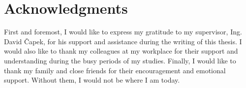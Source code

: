 
\section*{Acknowledgments}

First and foremost, I would like to express my gratitude to my supervisor, Ing. David Čapek, for his support and assistance during the writing of this thesis. I would also like to thank my colleagues at my workplace for their support and understanding during the busy periods of my studies. Finally, I would like to thank my family and close friends for their encouragement and emotional support. Without them, I would not be where I am today.

\vspace{2.5cm}
